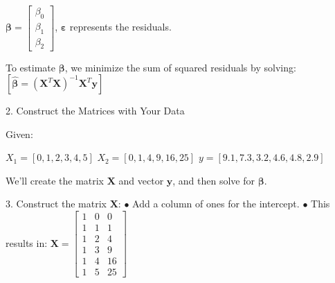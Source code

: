 \documentclass[11pt]{beamer}
\begin{document}
\begin{frame}
\hspace*{15pt}$\boldsymbol{\beta} = \begin{bmatrix} \beta_0 \\ \beta_1 \\ \beta_2 \end{bmatrix}$,
\medskip 
\linebreak 
\hspace*{15pt}$\mathbf{\varepsilon}$ represents the residuals.

\medskip
To estimate \(\boldsymbol{\beta}\), we minimize the sum of squared residuals by solving:
\bigskip
\linebreak
\hspace*{15pt}$[\boldsymbol{\hat{\beta}} = (\mathbf{X}^T \mathbf{X})^{-1} \mathbf{X}^T \mathbf{y}]$

\end{frame}

\begin{frame}
2. Construct the Matrices with Your Data

Given:

\hspace*{15pt}	$	 X_1 = [0, 1, 2, 3, 4, 5]$ \linebreak 
\hspace*{15pt}	$	 X_2 = [0, 1, 4, 9, 16, 25] $ \linebreak 
\hspace*{15pt}	$	 y   = [9.1, 7.3, 3.2, 4.6, 4.8, 2.9] $ \linebreak 
	
We’ll create the matrix $\mathbf{X}$ and vector $\mathbf{y}$, and then solve for $\boldsymbol{\beta}$.

\end{frame}

\begin{frame}
3.	Construct the matrix $\mathbf{X}$:
	\linebreak 
\hspace*{15pt}	$\bullet$ 	Add a column of ones for the intercept.
\medskip 
\linebreak 
\hspace*{15pt}	$\bullet$ 	This results in:
\medskip 
\linebreak 
				$\mathbf{X} = \begin{bmatrix}
				1 & 0 & 0 \\
				1 & 1 & 1 \\
				1 & 2 & 4 \\
				1 & 3 & 9 \\
				1 & 4 & 16 \\
				1 & 5 & 25
								\end{bmatrix}$
\end{frame}
\end{document}
